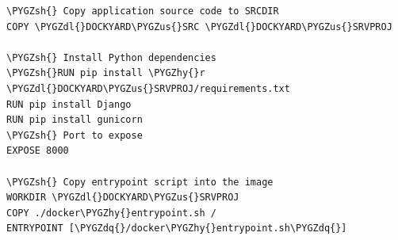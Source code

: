 \documentclass[letterpaper,10pt,english]{sphinxmanual}
\def\PYGZus{\char`\_}
\def\PYGZsh{\char`\#}
\def\PYGZdl{\char`\$}
\def\PYGZhy{\char`\-}
\def\PYGZdq{\char`\"}
\begin{document}
\begin{Verbatim}[commandchars=\\\{\}]
\PYGZsh{} Copy application source code to SRCDIR
COPY \PYGZdl{}DOCKYARD\PYGZus{}SRC \PYGZdl{}DOCKYARD\PYGZus{}SRVPROJ

\PYGZsh{} Install Python dependencies
\PYGZsh{}RUN pip install \PYGZhy{}r \PYGZdl{}DOCKYARD\PYGZus{}SRVPROJ/requirements.txt
RUN pip install Django
RUN pip install gunicorn
\PYGZsh{} Port to expose
EXPOSE 8000

\PYGZsh{} Copy entrypoint script into the image
WORKDIR \PYGZdl{}DOCKYARD\PYGZus{}SRVPROJ
COPY ./docker\PYGZhy{}entrypoint.sh /
ENTRYPOINT [\PYGZdq{}/docker\PYGZhy{}entrypoint.sh\PYGZdq{}]
\end{Verbatim}



\renewcommand{\indexname}{Index}
\printindex
\end{document}
